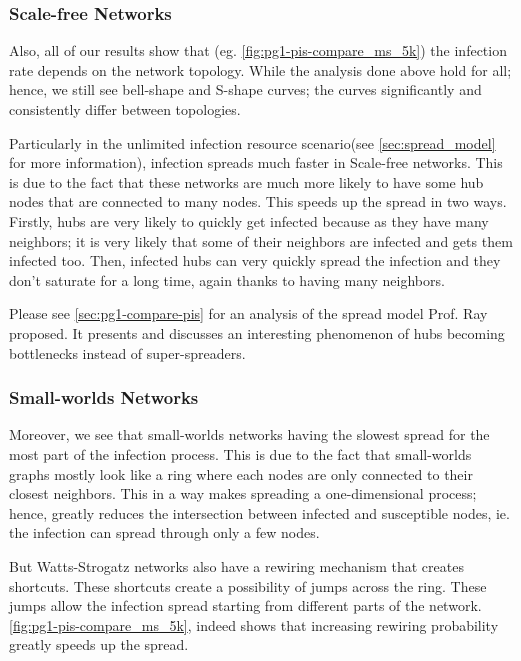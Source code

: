 \documentclass[conference]{IEEEtran}
\begin{document}
\subsubsection{Scale-free Networks}
Also, all of our results show that (eg. \autoref{fig:pg1-pis-compare_ms_5k}) the infection rate depends on the network topology. While the analysis done above hold for all; hence, we still see bell-shape and S-shape curves; the curves significantly and consistently differ between topologies.

Particularly in the unlimited infection resource scenario(see \autoref{sec:spread_model} for more information), infection spreads much faster in Scale-free networks. This is due to the fact that these networks are much more likely to have some hub nodes that are connected to many nodes. This speeds up the spread in two ways. Firstly, hubs are very likely to quickly get infected because as they have many neighbors; it is very likely that some of their neighbors are infected and gets them infected too. Then, infected hubs can very quickly spread the infection and they don't saturate for a long time, again thanks to having many neighbors.

Please see \autoref{sec:pg1-compare-pis} for an analysis of the spread model Prof. Ray proposed. It presents and discusses an interesting phenomenon of hubs becoming bottlenecks instead of super-spreaders.

\subsubsection{Small-worlds Networks}\label{sec:q1-small-worlds}

Moreover, we see that small-worlds networks having the slowest spread for the most part of the infection process. This is due to the fact that small-worlds graphs mostly look like a ring where each nodes are only connected to their closest neighbors. This in a way makes spreading a one-dimensional process; hence, greatly reduces the intersection between infected and susceptible nodes, ie. the infection can spread through only a few nodes.

But Watts-Strogatz networks also have a rewiring mechanism that creates shortcuts. These shortcuts create a possibility of jumps across the ring. These jumps allow the infection spread starting from different parts of the network. \autoref{fig:pg1-pis-compare_ms_5k}, indeed shows that increasing rewiring probability greatly speeds up the spread.
\end{document}
